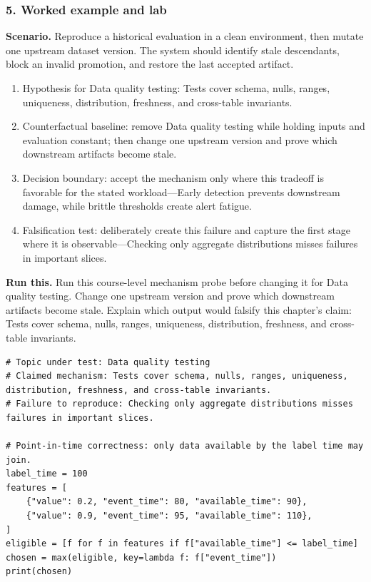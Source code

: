 \subsubsection*{5. Worked example and lab}
\textbf{Scenario.} Reproduce a historical evaluation in a clean environment, then mutate one upstream dataset version. The system should identify stale descendants, block an invalid promotion, and restore the last accepted artifact.
\begin{enumerate}
\item Hypothesis for Data quality testing: Tests cover schema, nulls, ranges, uniqueness, distribution, freshness, and cross-table invariants.
\item Counterfactual baseline: remove Data quality testing while holding inputs and evaluation constant; then change one upstream version and prove which downstream artifacts become stale.
\item Decision boundary: accept the mechanism only where this tradeoff is favorable for the stated workload—Early detection prevents downstream damage, while brittle thresholds create alert fatigue.
\item Falsification test: deliberately create this failure and capture the first stage where it is observable—Checking only aggregate distributions misses failures in important slices.
\end{enumerate}
\textbf{Run this.} Run this course-level mechanism probe before changing it for Data quality testing. Change one upstream version and prove which downstream artifacts become stale. Explain which output would falsify this chapter's claim: Tests cover schema, nulls, ranges, uniqueness, distribution, freshness, and cross-table invariants.
\begin{Verbatim}[fontsize=\scriptsize]
# Topic under test: Data quality testing
# Claimed mechanism: Tests cover schema, nulls, ranges, uniqueness, distribution, freshness, and cross-table invariants.
# Failure to reproduce: Checking only aggregate distributions misses failures in important slices.

# Point-in-time correctness: only data available by the label time may join.
label_time = 100
features = [
    {"value": 0.2, "event_time": 80, "available_time": 90},
    {"value": 0.9, "event_time": 95, "available_time": 110},
]
eligible = [f for f in features if f["available_time"] <= label_time]
chosen = max(eligible, key=lambda f: f["event_time"])
print(chosen)
\end{Verbatim}
